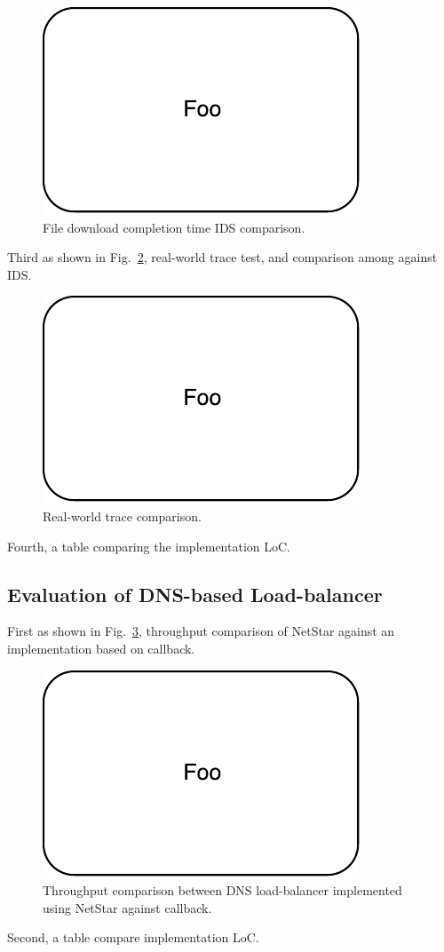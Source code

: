 \begin{figure}[!t]
  \centering
  \includegraphics[width=0.5\columnwidth]{figure/foo.pdf}
  \caption{File download completion time IDS comparison.}
  \label{ids2}
\end{figure}


Third as shown in Fig.~\ref{ids3}, real-world trace test, and comparison among against IDS.

\begin{figure}[!t]
  \centering
  \includegraphics[width=0.5\columnwidth]{figure/foo.pdf}
  \caption{Real-world trace comparison.}
  \label{ids3}
\end{figure}

Fourth, a table comparing the implementation LoC.

\subsection{Evaluation of DNS-based Load-balancer}

First as shown in Fig.~\ref{dns1}, throughput comparison of NetStar against an implementation based on callback.

\begin{figure}[!t]
  \centering
  \includegraphics[width=0.5\columnwidth]{figure/foo.pdf}
  \caption{Throughput comparison between DNS load-balancer implemented using NetStar against callback.}
  \label{dns1}
\end{figure}

Second, a table compare implementation LoC.
